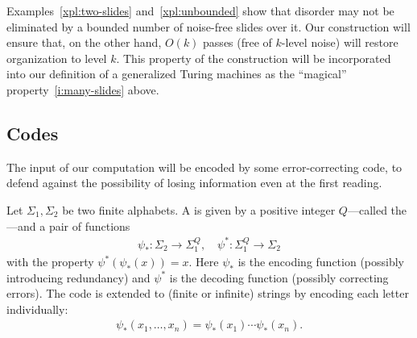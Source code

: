 \documentclass[11pt]{memoir}
\theoremstyle{definition} %
\newcommand{\Q}{Q} %
\begin{document}

Examples~\ref{xpl:two-slides} and~\ref{xpl:unbounded} show that disorder may not be
eliminated by a bounded number of noise-free slides over it.
Our construction will ensure that, on the other hand,
\( O(k) \) passes (free of \( k \)-level noise) will restore organization to level \( k \).
This property of the construction will be incorporated into our definition of a generalized
Turing machines as the ``magical'' property~\eqref{i:many-slides} above.

\subsection{Codes}\label{sec:codes}

The input of our computation will be encoded by some error-correcting code,
to defend against the possibility of losing information even at the first reading.

\begin{definition}[Codes]\label{def:codes}
    Let \( \Sigma_{1},\Sigma_{2} \) be two finite alphabets.
    A  is given by a positive integer \( \Q \)---called
    the ---and a pair of functions
    \begin{align*}
            \psi_{*} :\Sigma_{2}\to\Sigma_{1}^{\Q},
            \quad
            \psi^{*}:\Sigma_{1}^{\Q}\to\Sigma_{2}
    \end{align*}
    with the property \( \psi^{*}(\psi_{*}(x))=x \).
    Here \( \psi_{*} \) is the encoding function (possibly introducing redundancy)
    and \( \psi^{*} \) is the decoding function (possibly correcting errors).
    The code is extended to (finite or infinite) strings by encoding each letter individually:
\begin{align*}
 \psi_{*}(x_{1},\dots,x_{n})=\psi_{*}(x_{1})\dotsm\psi_{*}(x_{n}) .
\end{align*}

\end{definition}
\end{document}
